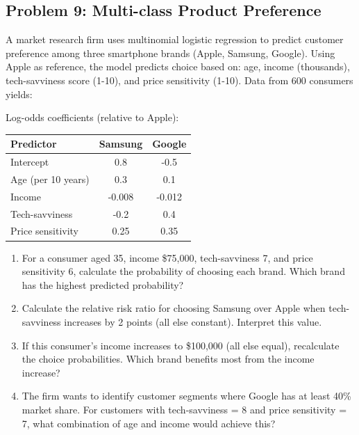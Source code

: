 \documentclass[12pt]{article}
\begin{document}
\subsection*{Problem 9: Multi-class Product Preference}

A market research firm uses multinomial logistic regression to predict customer preference among three smartphone brands (Apple, Samsung, Google). Using Apple as reference, the model predicts choice based on: age, income (thousands), tech-savviness score (1-10), and price sensitivity (1-10). Data from 600 consumers yields:

Log-odds coefficients (relative to Apple):

\begin{center}
\begin{tabular}{lcc}
\toprule
Predictor & Samsung & Google \\
\midrule
Intercept & 0.8 & -0.5 \\
Age (per 10 years) & 0.3 & 0.1 \\
Income & -0.008 & -0.012 \\
Tech-savviness & -0.2 & 0.4 \\
Price sensitivity & 0.25 & 0.35 \\
\bottomrule
\end{tabular}
\end{center}

\begin{enumerate}[label=(\alph*)]
\item For a consumer aged 35, income \$75,000, tech-savviness 7, and price sensitivity 6, calculate the probability of choosing each brand. Which brand has the highest predicted probability?

\item Calculate the relative risk ratio for choosing Samsung over Apple when tech-savviness increases by 2 points (all else constant). Interpret this value.

\item If this consumer's income increases to \$100,000 (all else equal), recalculate the choice probabilities. Which brand benefits most from the income increase?

\item The firm wants to identify customer segments where Google has at least 40\% market share. For customers with tech-savviness = 8 and price sensitivity = 7, what combination of age and income would achieve this?
\end{enumerate}
\end{document}

